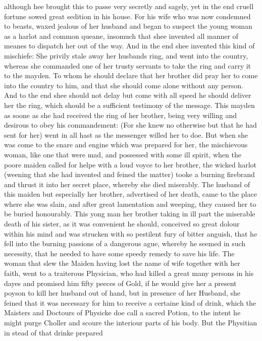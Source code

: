 although hee brought this to passe very secretly and sagely, yet in the end
cruell fortune sowed great sedition in his house. For his wife who was now
condemned to beasts, waxed jealous of her husband and began to suspect the
young woman as a harlot and common queane, insomuch that shee invented all
manner of meanes to dispatch her out of the way. And in the end shee invented
this kind of mischiefe: She privily stale away her husbands ring, and went into
the country, whereas she commanded one of her trusty servants to take the ring
and carry it to the mayden. To whom he should declare that her brother did pray
her to come into the country to him, and that she should come alone without any
person. And to the end shee should not delay but come with all speed he should
deliver her the ring, which should be a sufficient testimony of the message.
This mayden as soone as she had received the ring of her brother, being very
willing and desirous to obey his commandement: (For she knew no otherwise but
that he had sent for her) went in all hast as the messenger willed her to doe.
But when she was come to the snare and engine which was prepared for her, the
mischievous woman, like one that were mad, and possessed with some ill spirit,
when the poore maiden called for helpe with a loud voyce to her brother, the
wicked harlot (weening that she had invented and feined the matter) tooke a
burning firebrand and thrust it into her secret place, whereby she died
miserably. The husband of this maiden but especially her brother, advertised of
her death, came to the place where she was slain, and after great lamentation
and weeping, they caused her to be buried honourably. This yong man her brother
taking in ill part the miserable death of his sister, as it was convenient he
should, conceived so great dolour within his mind and was strucken with so
pestilent fury of bitter anguish, that he fell into the burning passions of a
dangerous ague, whereby he seemed in such necessity, that he needed to have
some speedy remedy to save his life. The woman that slew the Maiden having lost
the name of wife together with her faith, went to a traiterous Physician, who
had killed a great many persons in his dayes and promised him fifty peeces of
Gold, if he would give her a present poyson to kill her husband out of hand,
but in presence of her Husband, she feined that it was necessary for him to
receive a certaine kind of drink, which the Maisters and Doctours of Physicke
doe call a sacred Potion, to the intent he might purge Choller and scoure the
interiour parts of his body. But the Physitian in stead of that drinke prepared

